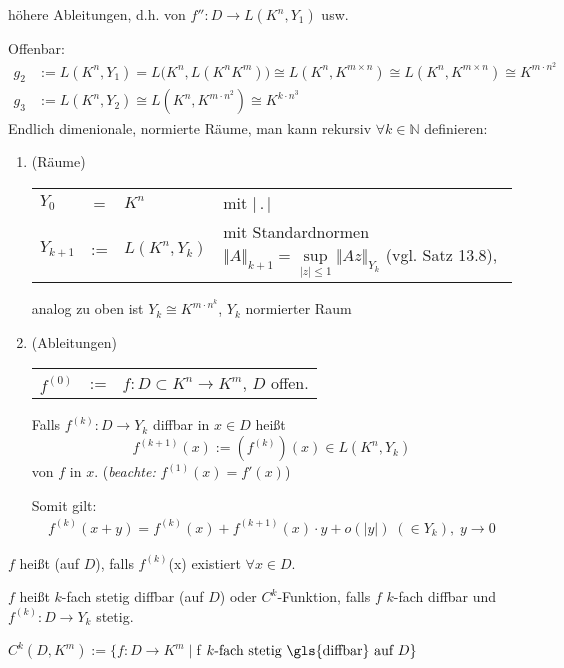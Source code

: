 \begin{boldenvironment}[Frage] höhere Ableitungen, d.h. von $f'':D\to L(K^n, Y_1)$ usw.
	
	Offenbar: \begin{align*}
		g_2&:= L(K^n, Y_1) = L\big(K^n, L(K^n K^m)\big) \cong L(K^n, K^{m\times n}) \cong L(K^n, K^{m\times n}) \cong K^{m\cdot n^2}\\
		g_3&:= L(K^n, Y_2) \cong L(K^n, K^{m\cdot n^2}) \cong K^{k\cdot n^3}
	\end{align*}
	Endlich dimenionale, normierte Räume, man kann rekursiv $\forall k\in \mathbb{N}$ definieren: \begin{enumerate}[label={(\roman*)}]
		\item (Räume)
		
		\begin{tabularx}{\linewidth}{l@{\ }c@{\ }l@{\ }X}
			$Y_0$ & = & $K^n$ &  mit $\vert\,.\,\vert$ \\
			$Y_{k+1}$ &  :=  & $L(K^n, Y_k)$ & mit Standardnormen $\Vert A\Vert_{k+1} = \sup\limits_{\vert z \vert \le 1} \Vert Az\Vert_{Y_k}$ (vgl. Satz 13.8),
		\end{tabularx}
		analog zu oben ist $Y_k\cong K^{m\cdot n^k}$, $Y_k$ normierter Raum
		
		\item (Ableitungen)
		
		\begin{tabularx}{\linewidth}{l@{\ }c@{\ }X}
			$f^{(0)}$ & := & $f:D\subset K^n\to K^m$, $D$ offen.\\
		\end{tabularx}
		Falls $f^{(k)}:D\to Y_k$ \gls{diffbar} in $x\in D$ heißt \[ f^{(k+1)}(x) := \left( f^{(k)} \right) (x)\in L(K^n, Y_k)  \]
		 von $f$ in $x$. (\emph{beachte:} $f^{(1)}(x) = f'(x)$)
		
		Somit gilt: \begin{align}
			f^{(k)} (x + y) = f^{(k)}(x) + f^{(k+1)}(x) \cdot y + o(\vert y \vert) \;(\in Y_k), \;y\to 0
		\end{align}
	\end{enumerate}
\end{boldenvironment}

\begin{*definition}
	$f$ heißt  (auf $D$), falls $f^{(k)}$(x) existiert $\forall x\in D$.
	
	$f$ heißt $k$-fach stetig \gls{diffbar} (auf $D$) oder $C^k$-Funktion, falls $f$ $k$-fach \gls{diffbar} und $f^{(k)}:D\to Y_k$ stetig.
	
	$C^k(D, K^m) := \{ f:D\to K^m\mid $f$ \text{ $k$-fach stetig \gls{diffbar} auf $D$} \}$
\end{*definition}

